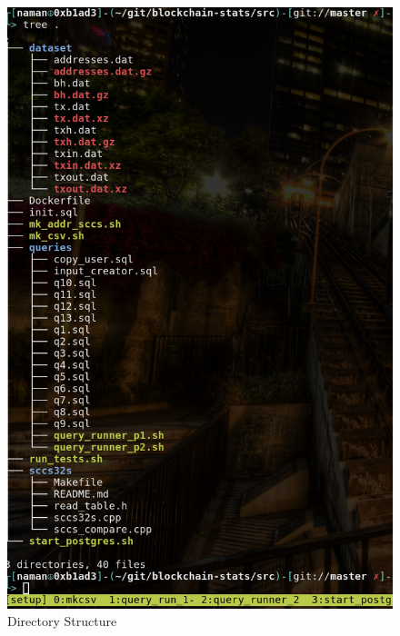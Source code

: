 \documentclass[conference,a4paper,12pt]{IEEEtran}
\begin{document}
	\begin{figure}[h!]
	  \includegraphics[width=\linewidth]{structure.png}
	  \caption{Directory Structure}
	  \label{Directory Structure}
	\end{figure}	
	
\end{document}
